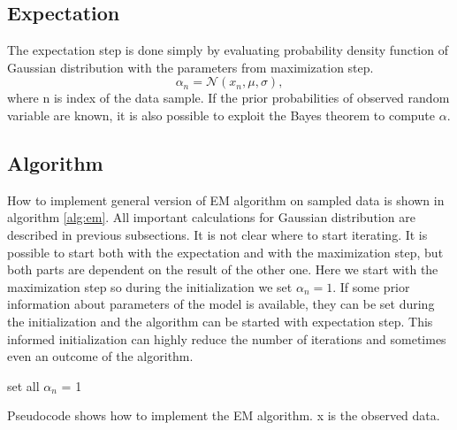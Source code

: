 \subsection{Expectation}
The expectation step is done simply by evaluating probability density function of Gaussian distribution with the parameters from maximization step.
\begin{equation}
\alpha_n = \mathcal{N}(x_n, \mu, \sigma),
\end{equation}
where n is index of the data sample. If the prior probabilities of observed random variable are known, it is also possible to exploit the Bayes theorem to compute $\alpha$.

\subsection{Algorithm}
How to implement general version of EM algorithm on sampled data is shown in algorithm \ref{alg:em}. All important calculations for Gaussian distribution are described in previous subsections. It is not clear where to start iterating. It is possible to start both with the expectation and with the maximization step, but both parts are dependent on the result of the other one. Here we start with the maximization step so during the initialization we set $\alpha_n = 1$. If some prior information about parameters of the model is available, they can be set during the initialization and the algorithm can be started with expectation step. This informed initialization can highly reduce the number of iterations and sometimes even an outcome of the algorithm.
\begin{algorithm}[]
 set all $\alpha_n$ = 1\;
 \caption{Pseudocode shows how to implement the EM algorithm. x is the observed data.}
 \label{alg:em}
\end{algorithm}



